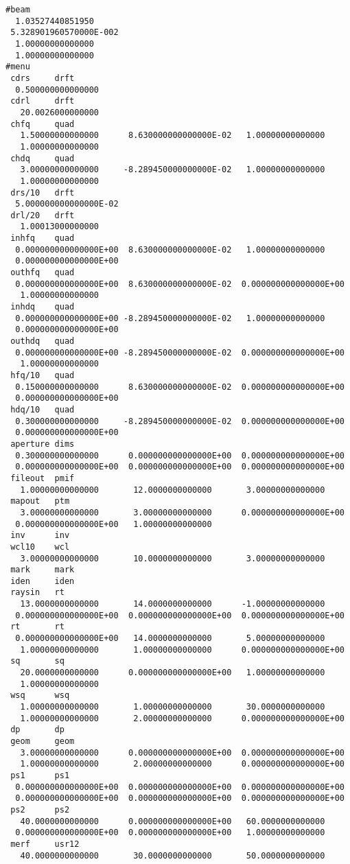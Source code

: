 \begin{footnotesize}
\begin{verbatim}
#beam
  1.03527440851950
 5.328901960570000E-002
  1.00000000000000
  1.00000000000000
#menu
 cdrs     drft
  0.500000000000000
 cdrl     drft
   20.0026000000000
 chfq     quad
   1.50000000000000      8.630000000000000E-02   1.00000000000000
   1.00000000000000
 chdq     quad
   3.00000000000000     -8.289450000000000E-02   1.00000000000000
   1.00000000000000
 drs/10   drft
  5.000000000000000E-02
 drl/20   drft
   1.00013000000000
 inhfq    quad
  0.000000000000000E+00  8.630000000000000E-02   1.00000000000000
  0.000000000000000E+00
 outhfq   quad
  0.000000000000000E+00  8.630000000000000E-02  0.000000000000000E+00
   1.00000000000000
 inhdq    quad
  0.000000000000000E+00 -8.289450000000000E-02   1.00000000000000
  0.000000000000000E+00
 outhdq   quad
  0.000000000000000E+00 -8.289450000000000E-02  0.000000000000000E+00
   1.00000000000000
 hfq/10   quad
  0.150000000000000      8.630000000000000E-02  0.000000000000000E+00
  0.000000000000000E+00
 hdq/10   quad
  0.300000000000000     -8.289450000000000E-02  0.000000000000000E+00
  0.000000000000000E+00
 aperture dims
  0.300000000000000      0.000000000000000E+00  0.000000000000000E+00
  0.000000000000000E+00  0.000000000000000E+00  0.000000000000000E+00
 fileout  pmif
   1.00000000000000       12.0000000000000       3.00000000000000
 mapout   ptm
   3.00000000000000       3.00000000000000      0.000000000000000E+00
  0.000000000000000E+00   1.00000000000000
 inv      inv
 wcl10    wcl
   3.00000000000000       10.0000000000000       3.00000000000000
 mark     mark
 iden     iden
 raysin   rt
   13.0000000000000       14.0000000000000      -1.00000000000000
  0.000000000000000E+00  0.000000000000000E+00  0.000000000000000E+00
 rt       rt
  0.000000000000000E+00   14.0000000000000       5.00000000000000
   1.00000000000000       1.00000000000000      0.000000000000000E+00
 sq       sq
   20.0000000000000      0.000000000000000E+00   1.00000000000000
   1.00000000000000
 wsq      wsq
   1.00000000000000       1.00000000000000       30.0000000000000
   1.00000000000000       2.00000000000000      0.000000000000000E+00
 dp       dp
 geom     geom
   3.00000000000000      0.000000000000000E+00  0.000000000000000E+00
   1.00000000000000       2.00000000000000      0.000000000000000E+00
 ps1      ps1
  0.000000000000000E+00  0.000000000000000E+00  0.000000000000000E+00
  0.000000000000000E+00  0.000000000000000E+00  0.000000000000000E+00
 ps2      ps2
   40.0000000000000      0.000000000000000E+00   60.0000000000000
  0.000000000000000E+00  0.000000000000000E+00   1.00000000000000
 merf     usr12
   40.0000000000000       30.0000000000000       50.0000000000000

\end{verbatim}
\end{footnotesize}
